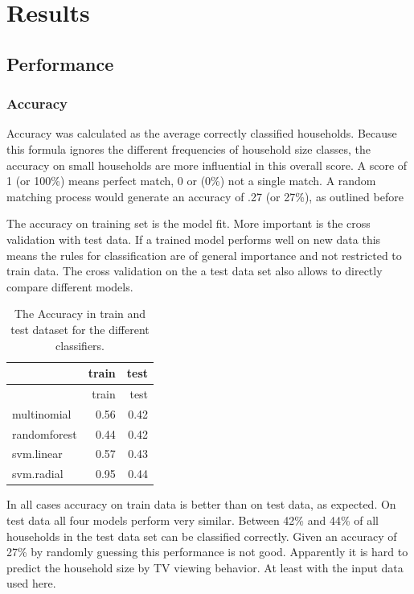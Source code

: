 \documentclass[]{article}
\begin{document}
\hypertarget{results}{%
\section{Results}\label{results}}

\hypertarget{performance}{%
\subsection{Performance}\label{performance}}

\hypertarget{accuracy}{%
\subsubsection{Accuracy}\label{accuracy}}

Accuracy was calculated as the average correctly classified households.
Because this formula ignores the different frequencies of household size
classes, the accuracy on small households are more influential in this
overall score. A score of 1 (or 100\%) means perfect match, 0 or (0\%)
not a single match. A random matching process would generate an accuracy
of .27 (or 27\%), as outlined before

The accuracy on training set is the model fit. More important is the
cross validation with test data. If a trained model performs well on new
data this means the rules for classification are of general importance
and not restricted to train data. The cross validation on the a test
data set also allows to directly compare different models.

\begin{longtable}[]{@{}lrr@{}}
\caption{\label{tab:tab7} The Accuracy in train and test dataset for the
different classifiers.}\tabularnewline
\toprule
& train & test\tabularnewline
\midrule
\endfirsthead
\toprule
& train & test\tabularnewline
\midrule
\endhead
multinomial & 0.56 & 0.42\tabularnewline
randomforest & 0.44 & 0.42\tabularnewline
svm.linear & 0.57 & 0.43\tabularnewline
svm.radial & 0.95 & 0.44\tabularnewline
\bottomrule
\end{longtable}

In all cases accuracy on train data is better than on test data, as
expected. On test data all four models perform very similar. Between
42\% and 44\% of all households in the test data set can be classified
correctly. Given an accuracy of 27\% by randomly guessing this
performance is not good. Apparently it is hard to predict the household
size by TV viewing behavior. At least with the input data used here.
\end{document}
